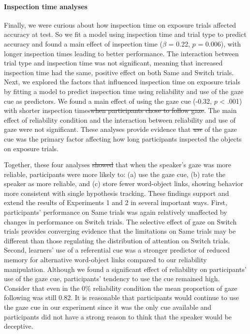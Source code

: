 \documentclass[authoryear, review]{elsarticle}
\providecommand{\DIFaddtex}[1]{{\protect\color{blue}\uwave{#1}}} %
\providecommand{\DIFdeltex}[1]{{\protect\color{red}\sout{#1}}}                      %
\providecommand{\DIFaddbegin}{} %
\providecommand{\DIFaddend}{} %
\providecommand{\DIFdelbegin}{} %
\providecommand{\DIFdelend}{} %
\providecommand{\DIFadd}[1]{\texorpdfstring{\DIFaddtex{#1}}{#1}} %
\providecommand{\DIFdel}[1]{\texorpdfstring{\DIFdeltex{#1}}{}} %
\begin{document}
\paragraph{Inspection time analyses}\label{inspection-time-analyses}

Finally, we were curious about how inspection time on exposure trials
affected accuracy at test. So we fit a model using inspection time and
trial type to predict accuracy and found a main effect of inspection
time (\(\beta\) = 0.22, \(p\) = 0.006), with longer inspection times
leading to better performance. The interaction between trial type and
inspection time was not significant, meaning that increased inspection
time had the same, positive effect on both Same and Switch trials. Next,
we explored the factors that influenced inspection time on exposure
trials by fitting a model to predict inspection time using reliability
and use of the gaze cue as predictors. We found a main effect of using
the gaze cue (-0.32, \(p\) \textless{} .001) with \DIFaddbegin \DIFadd{use of the gaze cue
leading to }\DIFaddend shorter inspection times\DIFdelbegin \DIFdel{when participants chose to follow gaze}\DIFdelend . The main effect of reliability
condition and the interaction between reliability and use of gaze were
not significant. These analyses provide evidence that \DIFdelbegin \emph{\DIFdel{use}} %
\DIFdelend \DIFaddbegin \DIFadd{use }\DIFaddend of the gaze
cue was the primary factor affecting how long participants inspected the
objects on exposure trials.

Together, these four analyses \DIFdelbegin \DIFdel{showed }\DIFdelend \DIFaddbegin \DIFadd{show }\DIFaddend that when the speaker's gaze was more
reliable, participants were more likely to: (a) use the gaze cue, (b)
rate the speaker as more reliable, and (c) store fewer word-object
links, showing behavior more consistent with single hypothesis tracking.
These findings support and extend the results of Experiments 1 and 2 in
several important ways. First, participants' performance on Same trials
was again relatively unaffected by changes in performance on Switch
trials. The selective effect of gaze on Switch trials provides
converging evidence that the limitations on Same trials may be different
than those regulating the distribution of attention on Switch trials.
Second, learners' use of a referential cue was a stronger predictor of
reduced memory for alternative word-object links compared to our
reliability manipulation. Although we found a significant effect of
reliability on participants' use of the gaze cue, participants' tendency
to use the cue remained high. Consider that even in the 0\% reliability
condition the mean proportion of gaze following was still 0.82. It is
reasonable that participants would continue to use the gaze cue in our
experiment since it was the only cue available and participants did not
have a strong reason to think that the speaker would be deceptive.
\end{document}
